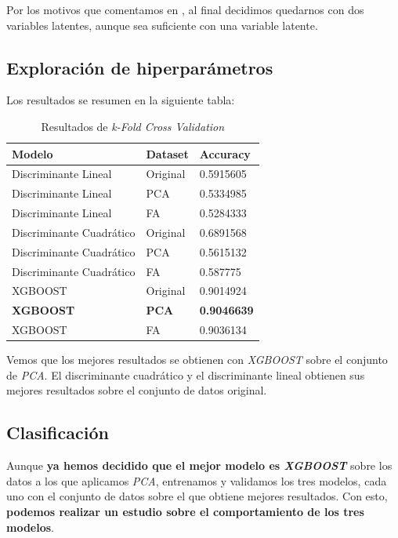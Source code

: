 \documentclass[11pt]{article}
\begin{document}
Por los motivos que comentamos en , al final decidimos quedarnos con dos variables latentes, aunque sea suficiente con una variable latente.

\subsection{Exploración de hiperparámetros}

Los resultados se resumen en la siguiente tabla:

\begin{table}[H]
\centering
\begin{tabular}{|l|l|l|}
    \hline
    Modelo                   & Dataset      & Accuracy      \\
    \hline
    Discriminante Lineal     & Original     & 0.5915605     \\
    Discriminante Lineal     & PCA          & 0.5334985     \\
    Discriminante Lineal     & FA           & 0.5284333     \\
    Discriminante Cuadrático & Original     & 0.6891568     \\
    Discriminante Cuadrático & PCA          & 0.5615132     \\
    Discriminante Cuadrático & FA           & 0.587775      \\
    XGBOOST                  & Original     & 0.9014924     \\
    \textbf{XGBOOST}         & \textbf{PCA} & \textbf{0.9046639} \\
    XGBOOST                  & FA           & 0.9036134     \\
    \hline

\end{tabular}
\caption{Resultados de \textit{k-Fold Cross Validation}}
\label{table:cross_validation}
\end{table}

Vemos que los mejores resultados se obtienen con \textit{XGBOOST} sobre el conjunto de \textit{PCA}. El discriminante cuadrático y el discriminante lineal obtienen sus mejores resultados sobre el conjunto de datos original.

\subsection{Clasificación}

Aunque \textbf{ya hemos decidido que el mejor modelo es \textit{XGBOOST}} sobre los datos a los que aplicamos \textit{PCA}, entrenamos y validamos los tres modelos, cada uno con el conjunto de datos sobre el que obtiene mejores resultados. Con esto, \textbf{podemos realizar un estudio sobre el comportamiento de los tres modelos}.
\end{document}
